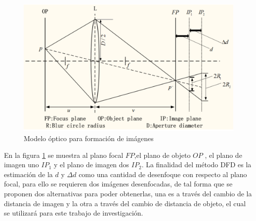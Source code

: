 \begin{figure}[ht]
\centering
\includegraphics[scale=0.50]{GraficosEdArt/ImagenLentesDFD.PNG} 
\caption{Modelo óptico para formación de imágenes \citet{Zhang:14}}
\label{fig3}
\end{figure}

En la figura \ref{fig3} se muestra al plano focal $FP$,el plano de objeto $OP$  , el plano de imagen uno $IP_{1}$ y el plano de imagen dos $IP_{2}$. La finalidad del método DFD es la estimación de la $d$ y $\Delta d$ como una cantidad de desenfoque con respecto al plano focal, para ello se requieren dos imágenes desenfocadas, de tal forma que se proponen dos alternativas para poder obtenerlas, una es a través del cambio de la distancia de imagen  y la otra a través del cambio de distancia de objeto, el cual se utilizará para este trabajo de investigación.

